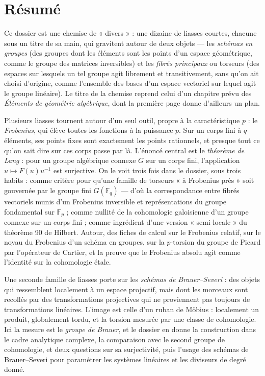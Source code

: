 \documentclass[11pt,a4paper]{article}
\begin{document}
\section*{Résumé}

\begin{resume}
Ce dossier est une chemise de « divers » : une dizaine de liasses courtes,
chacune sous un titre de sa main, qui gravitent autour de deux objets — les
\emph{schémas en groupes} (des groupes dont les éléments sont les points d'un
espace géométrique, comme le groupe des matrices inversibles) et les
\emph{fibrés principaux} ou torseurs (des espaces sur lesquels un tel groupe
agit librement et transitivement, sans qu'on ait choisi d'origine, comme
l'ensemble des bases d'un espace vectoriel sur lequel agit le groupe linéaire).
Le titre de la chemise reprend celui d'un chapitre prévu des \emph{Éléments de
géométrie algébrique}, dont la première page donne d'ailleurs un plan.

Plusieurs liasses tournent autour d'un seul outil, propre à la caractéristique
$p$ : le \emph{Frobenius}, qui élève toutes les fonctions à la puissance $p$.
Sur un corps fini à $q$ éléments, ses points fixes sont exactement les points
rationnels, et presque tout ce qu'on sait dire sur ces corps passe par là.
L'énoncé central est le \emph{théorème de Lang} : pour un groupe algébrique
connexe $G$ sur un corps fini, l'application $u \mapsto F(u)u^{-1}$ est
surjective. On le voit trois fois dans le dossier, sous trois habits : comme
critère pour qu'une famille de torseurs « à Frobenius près » soit gouvernée
par le groupe fini $G(\mathbb{F}_q)$ — d'où la correspondance entre fibrés
vectoriels munis d'un Frobenius inversible et représentations du groupe
fondamental sur $\mathbb{F}_p$ ; comme nullité de la cohomologie galoisienne
d'un groupe connexe sur un corps fini ; comme ingrédient d'une version
« semi-locale » du théorème 90 de Hilbert. Autour, des fiches de calcul sur le
Frobenius relatif, sur le noyau du Frobenius d'un schéma en groupes, sur la
$p$-torsion du groupe de Picard par l'opérateur de Cartier, et la preuve que
le Frobenius absolu agit comme l'identité sur la cohomologie étale.

Une seconde famille de liasses porte sur les \emph{schémas de Brauer–Severi} :
des objets qui ressemblent localement à un espace projectif, mais dont les
morceaux sont recollés par des transformations projectives qui ne proviennent
pas toujours de transformations linéaires. L'image est celle d'un ruban de
Möbius : localement un produit, globalement tordu, et la torsion mesurée par
une classe de cohomologie. Ici la mesure est le \emph{groupe de Brauer}, et le
dossier en donne la construction dans le cadre analytique complexe, la comparaison avec le second
groupe de cohomologie, et deux questions sur sa surjectivité, puis l'usage
des schémas de Brauer–Severi pour paramétrer les systèmes linéaires et les
diviseurs de degré donné.


\end{resume}
\end{document}

